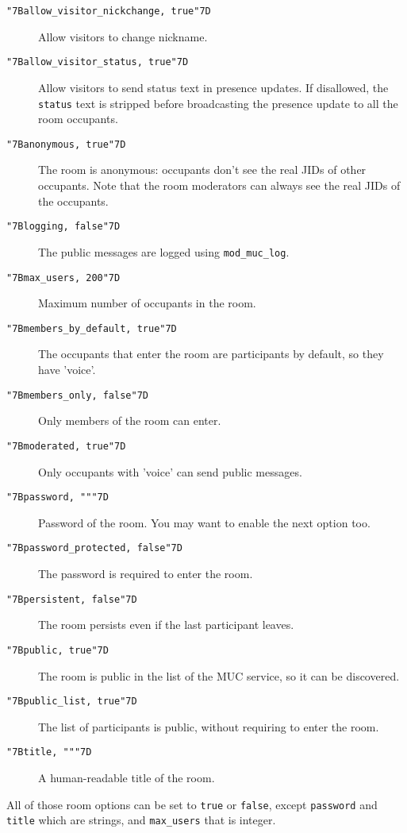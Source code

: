 \documentclass[a4paper,10pt]{book}
\newcommand{\bracehack}{\def\{{\char"7B}\def\}{\char"7D}}
\newcommand{\titem}[1]{\item[\bracehack\texttt{#1}]}
\newcommand{\term}[1]{\texttt{#1}}
\begin{document}
\begin{description}
\begin{description}
  \titem{\{allow\_visitor\_nickchange, true\}} Allow visitors to
  change nickname.
  \titem{\{allow\_visitor\_status, true\}} Allow visitors to send
  status text in presence updates.  If disallowed, the \term{status}
  text is stripped before broadcasting the presence update to all
  the room occupants.
  \titem{\{anonymous, true\}} The room is anonymous:
  occupants don't see the real JIDs of other occupants.
  Note that the room moderators can always see the real JIDs of the occupants.
  \titem{\{logging, false\}} The public messages are logged using \term{mod\_muc\_log}.
  \titem{\{max\_users, 200\}} Maximum number of occupants in the room.
  \titem{\{members\_by\_default, true\}} The occupants that enter the room are participants by default, so they have 'voice'.
  \titem{\{members\_only, false\}} Only members of the room can enter.
  \titem{\{moderated, true\}} Only occupants with 'voice' can send public messages.
  \titem{\{password, ""\}} Password of the room. You may want to enable the next option too.
  \titem{\{password\_protected, false\}} The password is required to enter the room.
  \titem{\{persistent, false\}} The room persists even if the last participant leaves.
  \titem{\{public, true\}} The room is public in the list of the MUC service, so it can be discovered.
  \titem{\{public\_list, true\}} The list of participants is public, without requiring to enter the room.
  \titem{\{title, ""\}} A human-readable title of the room.
  \end{description}
  All of those room options can be set to \term{true} or \term{false},
  except \term{password} and \term{title} which are strings,
  and \term{max\_users} that is integer.
\end{description}
\end{document}
